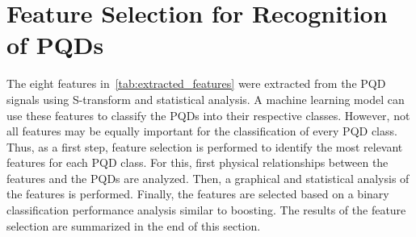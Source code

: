 \section{Feature Selection for Recognition of PQDs}
The eight features in~\autoref{tab:extracted_features} were extracted from the PQD signals using S-transform and statistical analysis. A machine learning model can use these features to classify the PQDs into their respective classes. However, not all features may be equally important for the classification of every PQD class. Thus, as a first step, feature selection is performed to identify the most relevant features for each PQD class. For this, first physical relationships between the features and the PQDs are analyzed. Then, a graphical and statistical analysis of the features is performed. Finally, the features are selected based on a binary classification performance analysis similar to boosting. The results of the feature selection are summarized in the end of this section.
